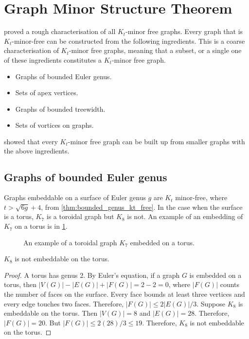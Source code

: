 \section{Graph Minor Structure Theorem}\label{sec:Kt_Minor_Free}
\textcite{robertsonGraphMinorsXVII1999} proved a rough characterisation of all \(K_t\)-minor free graphs. Every graph that is $K_t$-minor-free can be constructed from the following ingredients. This is a coarse characterisation of $K_t$-minor free graphs, meaning that a subset, or a single one of these ingredients constitutes a $K_t$-minor free graph. 
\begin{itemize}
	\item Graphs of bounded Euler genus.
	\item Sets of apex vertices.
	\item Graphs of bounded treewidth.
	\item Sets of vortices on graphs.
\end{itemize}
\textcite{robertsonGraphMinorsXVII1999} showed that every \(K_t\)-minor free graph can be built up from smaller graphs with the above ingredients.

\subsection{Graphs of bounded Euler genus}

Graphs embeddable on a surface of Euler genus $g$ are $K_t$ minor-free, where \(t > \sqrt{6g} + 4\), from \cref{thm:bounded_genus_kt_free}. In the case when the surface is a torus, $K_7$ is a toroidal graph but $K_8$ is not. An example of an embedding of $K_7$ on a torus is in \cref{fig:k7_on_torus}.

\begin{figure}[h!]
	\centering
	
	\caption[Toroidal graph]{An example of a toroidal graph $K_7$ embedded on a torus.}\label{fig:k7_on_torus}
\end{figure}

\begin{proposition}
	$K_8$ is not embeddable on the torus.
\end{proposition}
\begin{proof}
	A torus has genus 2. By Euler's equation, if a graph $G$ is embedded on a torus, then $|V(G)| - |E(G)| + |F(G)| = 2 - 2 = 0$, where $|F(G)|$ counts the number of faces on the surface. Every face bounds at least three vertices and every edge touches two faces. Therefore, $|F(G)| \leq 2|E(G)|/3$. Suppose $K_8$ is embeddable on the torus. Then $|V(G)| = 8$ and $|E(G)| = 28$. Therefore, $|F(G)| = 20$. But $|F(G)| \leq 2 (28)/3 \leq 19$. Therefore, $K_8$ is not embeddable on the torus.
\end{proof}


